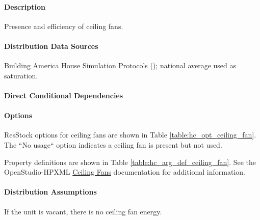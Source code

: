 \paragraph{Description}
% 
Presence and efficiency of ceiling fans.

\paragraph{Distribution Data Sources}
% 
Building America House Simulation Protocols (\cite{Wilson2014}); national average used as saturation.

\paragraph{Direct Conditional Dependencies}


\paragraph{Options}
ResStock options for ceiling fans are shown in Table \ref{table:hc_opt_ceiling_fan}. The ``No usage`` option indicates a ceiling fan is present but not used.



Property definitions are shown in Table \ref{table:hc_arg_def_ceiling_fan}. See the OpenStudio-HPXML \href{https://openstudio-hpxml.readthedocs.io/en/v1.10.0/workflow_inputs.html#hpxml-ceiling-fans}{Ceiling Fans} documentation for additional information.



\paragraph{Distribution Assumptions}
% 
If the unit is vacant, there is no ceiling fan energy.
